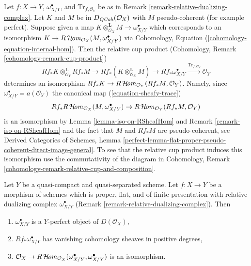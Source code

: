 \begin{remark}
\label{remark-relative-dualizing-complex-relative-cup-product}
Let $f : X \to Y$, $\omega^\bullet_{X/Y}$, and $\text{Tr}_{f, \mathcal{O}_Y}$
be as in Remark \ref{remark-relative-dualizing-complex}.
Let $K$ and $M$ be in $D_{\mathit{QCoh}}(\mathcal{O}_X)$ with
$M$ pseudo-coherent (for example perfect). Suppose given a map
$K \otimes_{\mathcal{O}_X}^\mathbf{L} M \to \omega^\bullet_{X/Y}$
which corresponds to an isomorphism
$K \to R\mathop{\mathcal{H}\!\mathit{om}}\nolimits_{\mathcal{O}_X}(M, \omega^\bullet_{X/Y})$
via Cohomology, Equation (\ref{cohomology-equation-internal-hom}).
Then the relative cup product
(Cohomology, Remark \ref{cohomology-remark-cup-product})
$$
Rf_*K \otimes_{\mathcal{O}_Y}^\mathbf{L} Rf_*M
\to
Rf_*(K \otimes_{\mathcal{O}_X}^\mathbf{L} M)
\to
Rf_*\omega^\bullet_{X/Y}
\xrightarrow{\text{Tr}_{f, \mathcal{O}_Y}}
\mathcal{O}_Y
$$
determines an isomorphism
$Rf_*K \to R\mathop{\mathcal{H}\!\mathit{om}}\nolimits_{\mathcal{O}_Y}(Rf_*M, \mathcal{O}_Y)$.
Namely, since $\omega^\bullet_{X/Y} = a(\mathcal{O}_Y)$
the canonical map (\ref{equation-sheafy-trace})
$$
Rf_*R\mathop{\mathcal{H}\!\mathit{om}}\nolimits_{\mathcal{O}_X}(M, \omega^\bullet_{X/Y}) \to
R\mathop{\mathcal{H}\!\mathit{om}}\nolimits_{\mathcal{O}_Y}(Rf_*M, \mathcal{O}_Y)
$$
is an isomorphism by
Lemma \ref{lemma-iso-on-RSheafHom} and
Remark \ref{remark-iso-on-RSheafHom}
and the fact that $M$ and $Rf_*M$ are pseudo-coherent, see
Derived Categories of Schemes, Lemma
\ref{perfect-lemma-flat-proper-pseudo-coherent-direct-image-general}.
To see that the relative cup product
induces this isomorphism use the commutativity of the diagram in
Cohomology, Remark \ref{cohomology-remark-relative-cup-and-composition}.
\end{remark}

\begin{lemma}
\label{lemma-properties-relative-dualizing}
Let $Y$ be a quasi-compact and quasi-separated scheme.
Let $f : X \to Y$ be a morphism of schemes which is
proper, flat, and of finite presentation with
relative dualizing complex $\omega_{X/Y}^\bullet$
(Remark \ref{remark-relative-dualizing-complex}).
Then
\begin{enumerate}
\item $\omega_{X/Y}^\bullet$ is a $Y$-perfect object of $D(\mathcal{O}_X)$,
\item $Rf_*\omega_{X/Y}^\bullet$ has vanishing cohomology sheaves
in positive degrees,
\item $\mathcal{O}_X \to
R\mathop{\mathcal{H}\!\mathit{om}}\nolimits_{\mathcal{O}_X}(\omega_{X/Y}^\bullet, \omega_{X/Y}^\bullet)$
is an isomorphism.
\end{enumerate}
\end{lemma}

